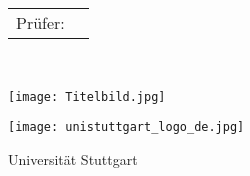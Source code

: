 \begin{titlepage}
\begin{minipage}[c]{105mm}
		\vspace{5mm}
		\hspace{-3.0mm} 
		\begin{tabular}{p{2.5cm}l}
			\textsf{Prüfer:}&\textsf{\Pruefer}	\\
		\end{tabular}
		
		\vspace{11mm}
		\textsf{\EndeMonat~\EndeJahr}
		
		\begin{minipage}[t][10.5cm][c]{\textwidth}
			\texttt{[image: Titelbild.jpg]}
		\end{minipage}
	
	
		\vspace{10mm}
		
		\begin{minipage}[c]{4\baselineskip}
			\vspace{-1mm}
			\texttt{[image: unistuttgart\_logo\_de.jpg]}
		\end{minipage}
		\begin{minipage}[c]{90mm}
			\small \textsf{Universität Stuttgart} \\
    		\small \textsf{\Institut} \\
    		\small \textsf{\ProfEins} \\
    		\small \textsf{\ProfZwei} 
		\end{minipage}

	\end{minipage}
	\cleardoublepage
\end{titlepage}
